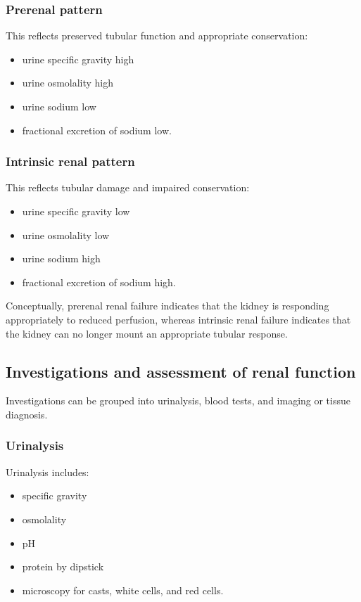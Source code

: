 \documentclass[11pt,a4paper]{article}
\begin{document}
\subsubsection{Prerenal pattern}

This reflects preserved tubular function and appropriate conservation:
\begin{itemize}
  \item urine specific gravity high
  \item urine osmolality high
  \item urine sodium low
  \item fractional excretion of sodium low.
\end{itemize}

\subsubsection{Intrinsic renal pattern}

This reflects tubular damage and impaired conservation:
\begin{itemize}
  \item urine specific gravity low
  \item urine osmolality low
  \item urine sodium high
  \item fractional excretion of sodium high.
\end{itemize}

Conceptually, prerenal renal failure indicates that the kidney is responding appropriately to reduced perfusion, whereas intrinsic renal failure indicates that the kidney can no longer mount an appropriate tubular response.\cite{KamPowerRenalFailure}

\subsection{Investigations and assessment of renal function}

Investigations can be grouped into urinalysis, blood tests, and imaging or tissue diagnosis.

\subsubsection{Urinalysis}

Urinalysis includes:
\begin{itemize}
  \item specific gravity
  \item osmolality
  \item pH
  \item protein by dipstick
  \item microscopy for casts, white cells, and red cells.
\end{itemize}
\end{document}
